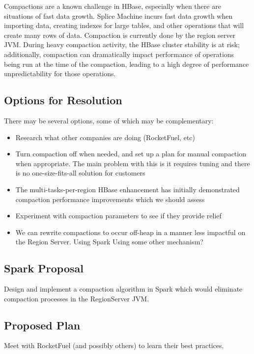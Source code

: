 \documentclass{article}
\begin{document}
Compactions are a known challenge in HBase, especially when there are situations of fast data growth.  Splice Machine incurs fast data growth when importing data, creating indexes for large tables, and other operations that will create many rows of data.  Compaction is currently done by the region server JVM.  During heavy compaction activity, the HBase cluster stability is at risk; additionally, compaction can dramatically impact performance of operations being run at the time of the compaction, leading to a high degree of performance unpredictability for those operations.

\subsection{Options for Resolution}

There may be several options, some of which may be complementary:

\begin{itemize}
	\item Research what other companies are doing (RocketFuel, etc)
	\item Turn compaction off when needed, and set up a plan for manual compaction when appropriate.  The main problem with this is it requires tuning and there is no one-size-fits-all solution for customers
	\item The multi-tasks-per-region HBase enhancement has initially demonstrated compaction performance improvements which we should assess
	\item Experiment with compaction parameters to see if they provide relief
	\item We can rewrite compactions to occur off-heap in a manner less impactful on the Region Server.  
		\subitem Using Spark
		\subitem Using some other mechanism?
\end{itemize}

\subsection{Spark Proposal}

Design and implement a compaction algorithm in Spark which would eliminate compaction processes in the RegionServer JVM.

\subsection{Proposed Plan}

Meet with RocketFuel (and possibly others) to learn their best practices.
\end{document}
